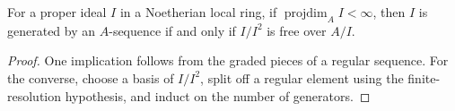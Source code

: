 \begin{theorem}\label{mcrt-thm-19-9}
For a proper ideal $I$ in a Noetherian local ring, if
$\operatorname{projdim}_A I<\infty$, then $I$ is generated by an $A$-sequence
if and only if $I/I^2$ is free over $A/I$.
\end{theorem}
\begin{proof}
One implication follows from the graded pieces of a regular sequence.  For the
converse, choose a basis of $I/I^2$, split off a regular element using the
finite-resolution hypothesis, and induct on the number of generators.
\end{proof}
